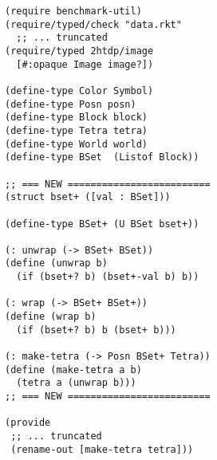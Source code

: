 \documentclass{article}
\begin{document}
{\begin{minipage}{0.4\textwidth}
\begin{verbatim}
(require benchmark-util)
(require/typed/check "data.rkt"
  ;; ... truncated
(require/typed 2htdp/image 
  [#:opaque Image image?])

(define-type Color Symbol)
(define-type Posn posn)
(define-type Block block)
(define-type Tetra tetra)
(define-type World world)
(define-type BSet  (Listof Block))

;; === NEW =========================
(struct bset+ ([val : BSet]))

(define-type BSet+ (U BSet bset+))

(: unwrap (-> BSet+ BSet))
(define (unwrap b)
  (if (bset+? b) (bset+-val b) b))

(: wrap (-> BSet+ BSet+))
(define (wrap b)
  (if (bset+? b) b (bset+ b)))

(: make-tetra (-> Posn BSet+ Tetra))
(define (make-tetra a b)
  (tetra a (unwrap b)))
;; === NEW =========================

(provide
 ;; ... truncated
 (rename-out [make-tetra tetra]))
\end{verbatim}
\end{minipage}
}
\end{document}

